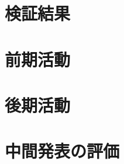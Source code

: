 \documentclass[11pt,a4paper,oneside]{jsbook}
\begin{document}
\chapter{検証結果}


\chapter{前期活動}

\chapter{後期活動}

\chapter{中間発表の評価}




%
%
%
%
\end{document}
